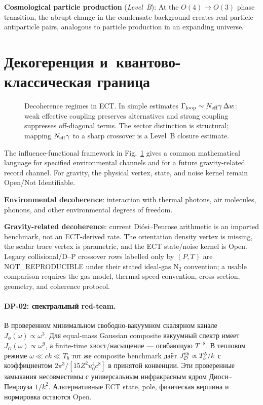 \documentclass[11pt,a4paper]{article}
\begin{document}
\textbf{Cosmological particle production} (\emph{Level~B}): At the $O(4) \to O(3)$ phase transition, the abrupt change in the condensate background creates real particle--antiparticle pairs, analogous to particle production in an expanding universe.


\section{Декогеренция и~квантово-классическая граница}

\begin{figure}[H]
\centering
{}
\caption{Decoherence regimes in ECT.  In simple estimates $\Gamma_{\rm loop}\sim N_{\rm eff}\gamma\,\Delta w$: weak effective coupling preserves alternatives and strong coupling suppresses off-diagonal terms.  The sector distinction is structural; mapping $N_{\rm eff}\gamma$ to a sharp crossover is a Level~B closure estimate.}
\label{fig:pop_qubit}
\end{figure}

The influence-functional framework in Fig.~\ref{fig:pop_qubit} gives a common mathematical language for specified environmental channels and for a future gravity-related record channel.  For gravity, the physical vertex, state, and noise kernel remain Open/Not Identifiable.

\textbf{Environmental decoherence}: interaction with thermal photons, air molecules, phonons, and other environmental degrees of freedom.

\textbf{Gravity-related decoherence}: current Di\'osi--Penrose arithmetic is an imported benchmark, not an ECT-derived rate.  The orientation density vertex is missing, the scalar trace vertex is parametric, and the ECT state/noise kernel is Open.  Legacy collisional/D--P crossover rows labelled only by $(P,T)$ are NOT\_REPRODUCIBLE under their stated ideal-gas N$_2$ convention; a usable comparison requires the gas model, thermal-speed convention, cross section, geometry, and coherence protocol.

\paragraph{DP-02: спектральный red-team.}
В проверенном минимальном свободно-вакуумном скалярном канале
$J_{\phi}(\omega)\propto\omega^3$. Для equal-mass Gaussian composite
вакуумный спектр имеет $J_{\mathcal O}(\omega)\propto\omega^9$, а
finite-time хвост/насыщение — огибающую $T^{-8}$. В тепловом режиме
$\omega\ll ck\ll T_b$ тот же composite benchmark даёт
$J_{\mathcal O}^{\rm th}\propto T_b^5/k$ с коэффициентом
$2\pi^3/[15Z^2u_0^4c^8]$ в принятой конвенции. Эти проверенные замыкания
несовместимы с универсальным инфракрасным ядром Диоси--Пенроуза $1/k^2$.
Альтернативные ECT state, pole, физическая вершина и нормировка остаются Open.
\end{document}
